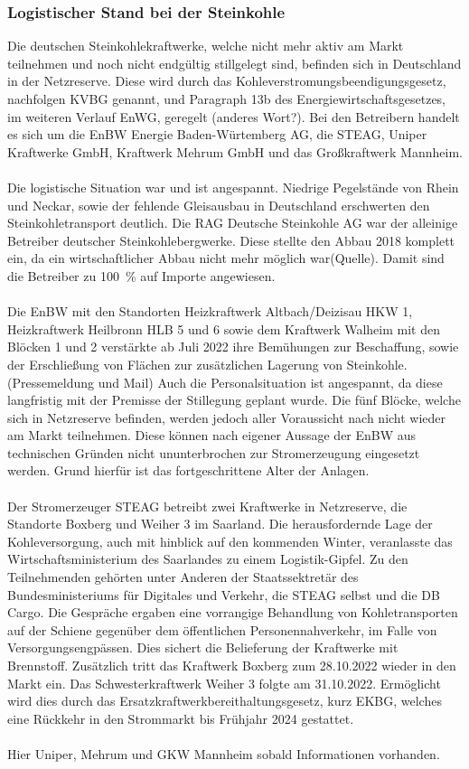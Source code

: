 		\subsubsection{Logistischer Stand bei der Steinkohle}
		Die deutschen Steinkohlekraftwerke, welche nicht mehr aktiv am Markt teilnehmen und noch nicht endgültig stillgelegt sind, befinden sich in Deutschland in der Netzreserve. Diese wird durch das Kohleverstromungsbeendigungsgesetz, nachfolgen KVBG genannt, und Paragraph 13b des Energiewirtschaftsgesetzes, im weiteren Verlauf EnWG, geregelt (anderes Wort?). Bei den Betreibern handelt es sich um die EnBW Energie Baden-Würtemberg AG, die STEAG, Uniper Kraftwerke GmbH, Kraftwerk Mehrum GmbH und das Großkraftwerk Mannheim. 
		\\
		\\
		Die logistische Situation war und ist angespannt. Niedrige Pegelstände von Rhein und Neckar, sowie der fehlende Gleisausbau in Deutschland erschwerten den Steinkohletransport deutlich. Die RAG Deutsche Steinkohle AG war der alleinige Betreiber deutscher Steinkohlebergwerke. Diese stellte den Abbau 2018 komplett ein, da ein wirtschaftlicher Abbau nicht mehr möglich war(Quelle). Damit sind die Betreiber zu \SI{100}{\percent} auf Importe angewiesen.
		\\
		\\
		Die EnBW mit den Standorten Heizkraftwerk Altbach/Deizisau HKW 1, Heizkraftwerk Heilbronn HLB 5 und 6 sowie dem Kraftwerk Walheim mit den Blöcken 1 und 2 verstärkte ab Juli 2022 ihre Bemühungen zur Beschaffung, sowie der Erschließung von Flächen zur zusätzlichen Lagerung von Steinkohle.(Pressemeldung und Mail) Auch die Personalsituation ist angespannt, da diese langfristig mit der Premisse der Stillegung geplant wurde. Die fünf Blöcke, welche sich in Netzreserve befinden, werden jedoch aller Voraussicht nach nicht wieder am Markt teilnehmen. Diese können nach eigener Aussage der EnBW aus technischen Gründen nicht ununterbrochen zur Stromerzeugung eingesetzt werden. Grund hierfür ist das fortgeschrittene Alter der Anlagen.
		\\
		\\
		Der Stromerzeuger STEAG betreibt zwei Kraftwerke in Netzreserve, die Standorte Boxberg und Weiher 3 im Saarland. Die herausfordernde Lage der Kohleversorgung, auch mit hinblick auf den kommenden Winter, veranlasste das Wirtschaftsministerium des Saarlandes zu einem Logistik-Gipfel. Zu den Teilnehmenden gehörten unter Anderen der Staatssektretär des Bundesministeriums für Digitales und Verkehr, die STEAG selbst und die DB Cargo. Die Gespräche ergaben eine vorrangige Behandlung von Kohletransporten auf der Schiene gegenüber dem öffentlichen Personennahverkehr, im Falle von Versorgungsengpässen. Dies sichert die Belieferung der Kraftwerke mit Brennstoff. Zusätzlich tritt das Kraftwerk Boxberg zum 28.10.2022 wieder in den Markt ein. Das Schwesterkraftwerk Weiher 3 folgte am 31.10.2022. Ermöglicht wird dies durch das Ersatzkraftwerkbereithaltungsgesetz, kurz EKBG, welches eine Rückkehr in den Strommarkt bis Frühjahr 2024 gestattet.
		\\
		\\
		Hier Uniper, Mehrum und GKW Mannheim sobald Informationen vorhanden.
		
